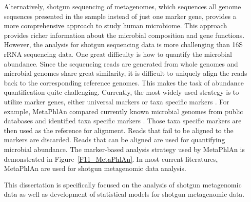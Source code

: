 Alternatively, shotgun sequencing of metagenomes, which sequences all genome sequences presented in the sample instead of just one marker gene, provides a more comprehensive approach to study human microbiome. This approach provides richer information about the microbial composition and gene functions. However, the analysis for shotgun sequencing data is more challenging than 16S rRNA sequencing data. One great difficulty is how to quantify the microbial abundance. Since the sequencing reads are generated from whole genomes and microbial genomes share great similarity, it is difficult to uniquely align the reads back to the corresponding reference genomes. This makes the task of abundance quantification quite challenging. Currently, the most widely used strategy is to utilize  marker genes, either universal  markers \citep{Sunagawa:2013if} or taxa specific markers \citep{segata2012metagenomic}. For example, MetaPhlAn compared currently known microbial genomes from public databases and identified taxa specific markers \citep{segata2012metagenomic}. Those taxa specific markers are then used as the reference for alignment. Reads that fail to be aligned to the markers are discarded. Reads that can be aligned are used for quantifying microbial abundance. The marker-based analysis strategy used by MetaPhlAn is demonstrated in Figure~\ref{F11_MetaPhlAn}. In most current literatures, MetaPhlAn are used for shotgun metagenomic data analysis.



This dissertation is specifically focused on the analysis of shotgun metagenomic data as well as development of statistical models for shotgun metagenomic data. 



